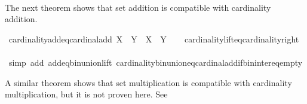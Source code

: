 \begin{isabellebody}
\isanewline
\ \ \ \ \ \ \isamarkupfalse%
%
\endisatagproof
{\isafoldproof}%
%
\isadelimproof
%
\endisadelimproof
%
\begin{isamarkuptext}%
The next theorem shows that set addition is compatible with cardinality addition.%
\end{isamarkuptext}\isamarkuptrue%
\isamarkupfalse%
\ cardinality{\isacharunderscore}{\kern0pt}add{\isacharunderscore}{\kern0pt}eq{\isacharunderscore}{\kern0pt}cardinal{\isacharunderscore}{\kern0pt}add{\isacharcolon}{\kern0pt}\ {\isachardoublequoteopen}{\isacharbar}{\kern0pt}X\ {\isacharplus}{\kern0pt}\ Y{\isacharbar}{\kern0pt}\ {\isacharequal}{\kern0pt}\ {\isacharbar}{\kern0pt}X{\isacharbar}{\kern0pt}\ {\isasymoplus}\ {\isacharbar}{\kern0pt}Y{\isacharbar}{\kern0pt}{\isachardoublequoteclose}\isanewline
%
\isadelimproof
\ \ %
\endisadelimproof
%
\isatagproof
{}\isamarkupfalse%
\ cardinality{\isacharunderscore}{\kern0pt}lift{\isacharunderscore}{\kern0pt}eq{\isacharunderscore}{\kern0pt}cardinality{\isacharunderscore}{\kern0pt}right\isanewline
\ \ \isamarkupfalse%
\ {\isacharparenleft}{\kern0pt}simp\ add{\isacharcolon}{\kern0pt}\ add{\isacharunderscore}{\kern0pt}eq{\isacharunderscore}{\kern0pt}bin{\isacharunderscore}{\kern0pt}union{\isacharunderscore}{\kern0pt}lift\ cardinality{\isacharunderscore}{\kern0pt}bin{\isacharunderscore}{\kern0pt}union{\isacharunderscore}{\kern0pt}eq{\isacharunderscore}{\kern0pt}cardinal{\isacharunderscore}{\kern0pt}add{\isacharunderscore}{\kern0pt}if{\isacharunderscore}{\kern0pt}bin{\isacharunderscore}{\kern0pt}inter{\isacharunderscore}{\kern0pt}eq{\isacharunderscore}{\kern0pt}empty{\isacharparenright}{\kern0pt}%
\endisatagproof
{\isafoldproof}%
%
\isadelimproof
%
\endisadelimproof
%
\begin{isamarkuptext}%
A similar theorem shows that set multiplication is compatible with cardinality multiplication,
but it is not proven here. See%
\end{isamarkuptext}\isamarkuptrue%
%
\isadelimtheory
%
\endisadelimtheory
%
\isatagtheory
{}\isamarkupfalse%
%
\endisatagtheory
{\isafoldtheory}%
%
\isadelimtheory
%
\endisadelimtheory
%
\end{isabellebody}%
\endinput
